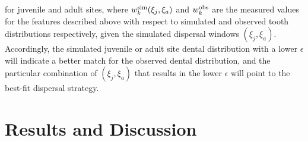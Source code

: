 \documentclass[]{rsos}%
\begin{document}
for juvenile and adult sites, where $w^{\rm sim}_k(\xi_j,\xi_a)$ and $w^{\rm obs}_k$ are the measured values for the features described above with respect to simulated and observed tooth distributions respectively, given the simulated dispersal windows $(\xi_j,\xi_a)$.
Accordingly, the simulated juvenile or adult site dental distribution with a lower $\epsilon$ will indicate a better match for the observed dental distribution, and the particular combination of $(\xi_j,\xi_a)$ that results in the lower $\epsilon$ will point to the best-fit dispersal strategy.









\section{Results and Discussion}

\end{document}
